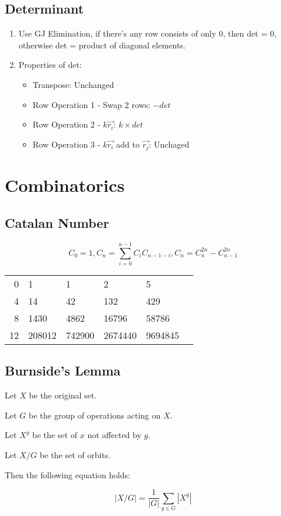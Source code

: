 \documentclass[a4paper,10pt,twocolumn,oneside,x11names]{article}
\begin{document}
\subsection{Determinant}
{\normalsize
\noindent
\begin{enumerate}
\item Use GJ Elimination, if there's any row consists of only 0, then det = 0, otherwise det = product of diagonal elements.
\item Properties of det:
\begin{itemize}
    \item Transpose: Unchanged
    \item Row Operation 1 - Swap 2 rows: $-det$
    \item Row Operation 2 - $k \overrightarrow{r_i}$: $k \times det$
    \item Row Operation 3 - $k \overrightarrow{r_i}$ add to  $\overrightarrow{r_j}$: Unchaged
\end{itemize}
\end{enumerate}
}

\section{Combinatorics}

\subsection{Catalan Number}
$$
C_0=1, C_n=\sum_{i=0}^{n-1} C_i C_{n-1-i}, C_n=C_n^{2n}-C_{n-1}^{2n}
$$

\begin{center}
    \begin{tabular}{r|lllll}
        0 & 1 & 1 & 2 & 5 \\
        4 & 14 & 42 & 132 & 429 \\
        8 & 1430 & 4862 & 16796 & 58786 \\
        12 & 208012 & 742900 & 2674440 & 9694845
    \end{tabular}
\end{center}

\subsection{Burnside's Lemma}
{\normalsize
Let $X$ be the original set.

Let $G$ be the group of operations acting on $X$.

Let $X^g$ be the set of $x$ not affected by $g$.

Let $X/G$ be the set of orbits.

Then the following equation holds:

$$
|X/G| = \frac{1}{|G|} \sum_{g \in G} |X^g|
$$
}
\end{document}
